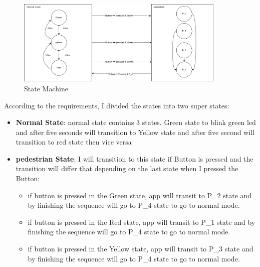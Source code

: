 \documentclass[pdftex,10pt,a4paper,oneside]{article}
\begin{document}
\begin{figure}[H]
  \centering
  \includegraphics[width=100mm,scale=5]{state_machine.png}
  \caption{State Machine}
  \label{a}
\end{figure}
According to the requirements, I divided the states into two super states:
\begin{itemize}
	\item \textbf{Normal State}: normal state contains 3 states. Green state to blink green 
	led and after five seconds will transition to Yellow state and after five second 
	will transition to red state then vice versa
	\item \textbf{pedestrian State}: I will transition to  this state if Button is pressed and the transition will differ that depending on 
	the last state when I pressed the Button:
	\begin{itemize}
		\item if button is pressed in the Green state, app will transit to P\_2 state and by finishing the sequence will go to P\_4 state to go to normal mode.
		\item if button is pressed in the Red state, app will transit to 
		P\_1 state and by finishing the 
		sequence will go to P\_4 state to go to normal mode. 
		\item if button is pressed in the Yellow state, app will transit to 
		P\_3 state and by finishing the 
		sequence will go to P\_4 state to go to normal mode. 
	
	\end{itemize}
\end{itemize}
\end{document}

